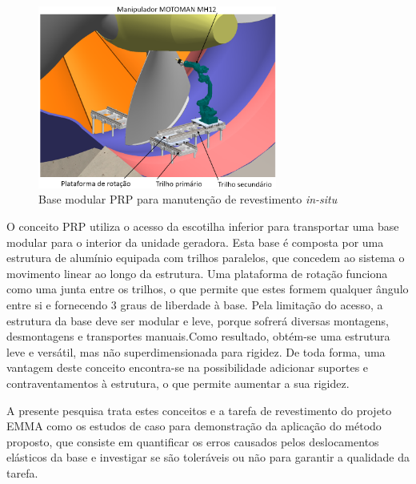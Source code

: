 \begin{figure}[h!]
	\centering 
 	\includegraphics[width=0.70\textwidth]{figs/prp_turbina}
 	\caption{Base modular PRP para manutenção de revestimento \textit{in-situ}}
 	\label{fig::prp_turbina}
\end{figure}

O conceito PRP utiliza o acesso da escotilha inferior para transportar uma base
modular para o interior da unidade geradora. Esta base é composta por uma
estrutura de alumínio equipada com trilhos paralelos, que concedem ao sistema o
movimento linear ao longo da estrutura. Uma plataforma de rotação funciona como
uma junta entre os trilhos, o que permite que estes formem qualquer ângulo entre
si e fornecendo 3 graus de liberdade à base. Pela limitação do acesso, a
estrutura da base deve ser modular e leve, porque sofrerá diversas montagens,
desmontagens e transportes manuais.Como resultado, obtém-se uma estrutura leve e
versátil, mas não superdimensionada para rigidez. De toda forma, uma vantagem
deste conceito encontra-se na possibilidade adicionar suportes e
contraventamentos à estrutura, o que permite aumentar a sua rigidez.

A presente pesquisa trata estes conceitos e a tarefa de revestimento do projeto
EMMA como os estudos de caso para demonstração da aplicação do método proposto,
que consiste em quantificar os erros causados pelos deslocamentos elásticos da
base e investigar se são toleráveis ou não para garantir a qualidade da tarefa.


















